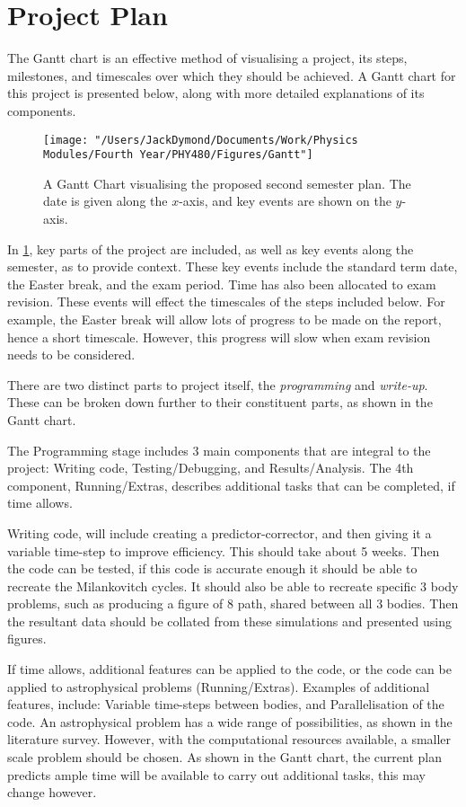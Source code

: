 \documentclass[a4paper,10pt]{article}
\begin{document}
\section{Project Plan}

The Gantt chart is an effective method of visualising a project, its steps, milestones, and timescales over which they should be achieved. A Gantt chart for this project is presented below, along with more detailed explanations of its components.


\begin{figure}[h!]
    \centering
    \texttt{[image: "/Users/JackDymond/Documents/Work/Physics Modules/Fourth Year/PHY480/Figures/Gantt"]}
    \caption{A Gantt Chart visualising the proposed second semester plan. The date is given along the $x$-axis, and key events are shown on the $y$-axis.}
    \label{Gantt}
\end{figure}

In \cref{Gantt}, key parts of the project are included, as well as key events along the semester, as to provide context. These key events include the standard term date, the Easter break, and the exam period. Time has also been allocated to exam revision. These events will effect the timescales of the steps included below. For example, the Easter break will allow lots of progress to be made on the report, hence a short timescale. However, this progress will slow when exam revision needs to be considered.

There are two distinct parts to project itself, the \textit{programming} and \textit{write-up}. These can be broken down further to their constituent parts, as shown in the Gantt chart.

The Programming stage includes 3 main components that are integral to the project: Writing code, Testing/Debugging, and Results/Analysis. The 4th component, Running/Extras, describes additional tasks that can be completed, if time allows.

Writing code, will include creating a predictor-corrector, and then giving it a variable time-step to improve efficiency. This should take about 5 weeks. Then the code can be tested, if this code is accurate enough it should be able to recreate the Milankovitch cycles. It should also be able to recreate specific 3 body problems, such as producing a figure of 8 path, shared between all 3 bodies. Then the resultant data should be collated from these simulations and presented using figures.

If time allows, additional features can be applied to the code, or the code can be applied to astrophysical problems (Running/Extras). Examples of additional features, include: Variable time-steps between bodies, and Parallelisation of the code. An astrophysical problem has a wide range of possibilities, as shown in the literature survey. However, with the computational resources available, a smaller scale problem should be chosen. As shown in the Gantt chart, the current plan predicts ample time will be available to carry out additional tasks, this may change however.
\end{document}
